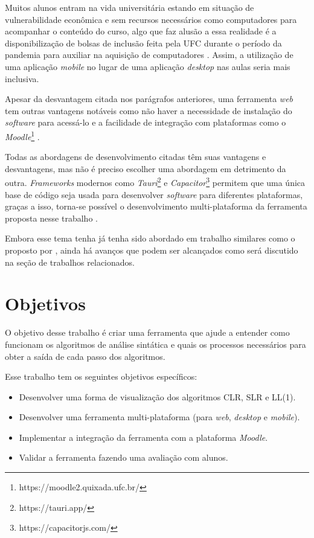 Muitos alunos entram na vida universitária estando em situação de vulnerabilidade econômica e sem recursos necessários como computadores para acompanhar o conteúdo do curso, algo que faz alusão a essa realidade é a disponibilização de bolsas de inclusão feita pela UFC durante o período da pandemia para auxiliar na aquisição de computadores \cite{povo_ufc_2020}. Assim, a utilização de uma aplicação \textit{mobile} no lugar de uma aplicação \textit{desktop} nas aulas seria mais inclusiva.

Apesar da desvantagem citada nos parágrafos anteriores, uma ferramenta \textit{web} tem outras vantagens notáveis como não haver a necessidade de instalação do \textit{software} para acessá-lo e a facilidade de integração com plataformas como o \textit{Moodle}\footnote{https://moodle2.quixada.ufc.br/} \cite{desai_web_2022}.

Todas as abordagens de desenvolvimento citadas têm suas vantagens e desvantagens, mas não é preciso  escolher uma abordagem em detrimento da outra. \textit{Frameworks} modernos como \textit{Tauri}\footnote{https://tauri.app/} e \textit{Capacitor}\footnote{https://capacitorjs.com/} permitem que uma única base de código seja usada para desenvolver \textit{software} para diferentes plataformas, graças a isso, torna-se possível o desenvolvimento multi-plataforma da ferramenta proposta nesse trabalho \cite{shevtsiv2021cross}.

Embora esse tema tenha já tenha sido abordado em trabalho similares como o proposto por \textcite{pavt}, ainda há avanços que podem ser alcançados como será discutido na seção de trabalhos relacionados.

\section{Objetivos}
O objetivo desse trabalho é criar uma ferramenta que ajude a entender como funcionam os algoritmos de análise sintática e quais os processos necessários para obter a saída de cada passo dos algoritmos.

Esse trabalho tem os seguintes objetivos específicos:
\begin{itemize}[label=$\sbullet$]
    \item Desenvolver uma forma de visualização dos algoritmos CLR, SLR e LL(1).
    \item Desenvolver uma ferramenta multi-plataforma (para \textit{web}, \textit{desktop} e \textit{mobile}).
    \item Implementar a integração da ferramenta com a plataforma \textit{Moodle}.
    \item Validar a ferramenta fazendo uma avaliação com alunos.
\end{itemize}


